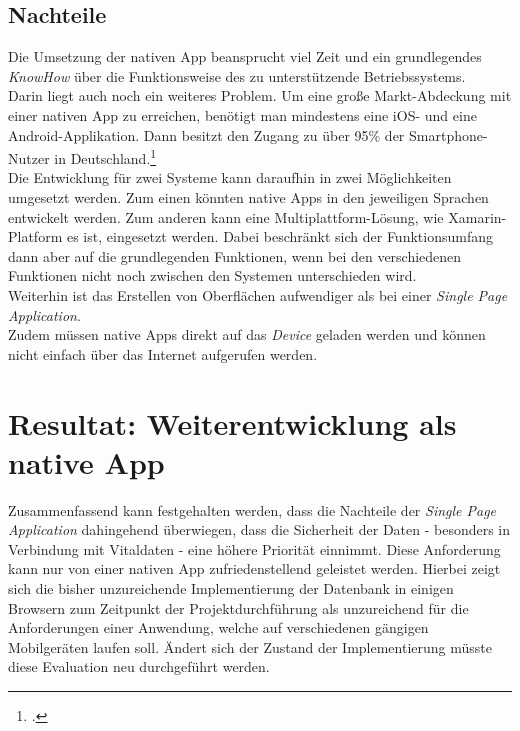 \subsection{Nachteile}
\label{sec:nachteile-native-app}
Die Umsetzung der nativen App beansprucht viel Zeit und ein grundlegendes \textit{KnowHow} über die Funktionsweise des zu unterstützende Betriebssystems.\\
Darin liegt auch noch ein weiteres Problem. Um eine große Markt-Abdeckung mit einer nativen App zu erreichen, benötigt man mindestens eine iOS- und eine Android-Applikation. Dann besitzt den Zugang zu über 95\% der Smartphone-Nutzer in Deutschland.\footcite{Statista-SmartphoneVerteilung}\\
Die Entwicklung für zwei Systeme kann daraufhin in zwei Möglichkeiten umgesetzt werden. Zum einen könnten native Apps in den jeweiligen Sprachen entwickelt werden. Zum anderen kann eine Multiplattform-Lösung, wie Xamarin-Platform es ist, eingesetzt werden. Dabei beschränkt sich der Funktionsumfang dann aber auf die grundlegenden Funktionen, wenn bei den verschiedenen Funktionen nicht noch zwischen den Systemen unterschieden wird.\\
Weiterhin ist das Erstellen von Oberflächen aufwendiger als bei einer \textit{Single Page Application}.\\
Zudem müssen native Apps direkt auf das \textit{Device} geladen werden und können nicht einfach über das Internet aufgerufen werden.

\section{Resultat: Weiterentwicklung als native App}
\label{sec:gegenueberstellung-fazit}
Zusammenfassend kann festgehalten werden, dass die Nachteile der \textit{Single Page Application} dahingehend überwiegen, dass die Sicherheit der Daten - besonders in Verbindung mit Vitaldaten - eine höhere Priorität einnimmt. Diese Anforderung kann nur von einer nativen App zufriedenstellend geleistet werden. Hierbei zeigt sich die bisher unzureichende Implementierung der Datenbank in einigen Browsern zum Zeitpunkt der Projektdurchführung als unzureichend für die Anforderungen einer Anwendung, welche auf verschiedenen gängigen Mobilgeräten laufen soll. Ändert sich der Zustand der Implementierung müsste diese Evaluation neu durchgeführt werden. 
